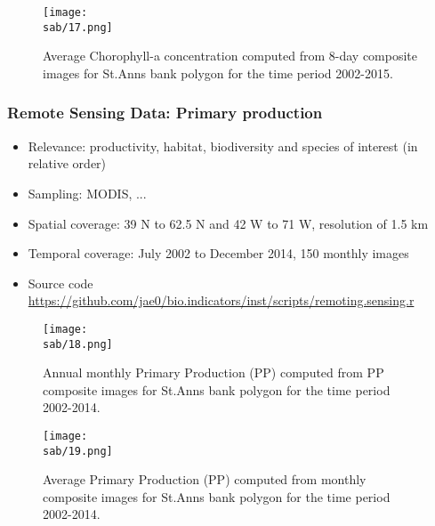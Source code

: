 \documentclass{beamer}
\numberwithin{equation}{section}		%
\numberwithin{figure}{section}		%
\numberwithin{table}{section}				%
\newcommand{\D}{.}
\newcommand{\bd}{\string~/bio\D data}   %
\newcommand{\sab}{\bd/mpa/sab}   %
\begin{document}

\begin{frame}[shrink]
  \begin{figure}[h]
    \centering
    \texttt{[image: \\sab/17.png]}
    \caption {Average Chorophyll-a concentration computed from 8-day composite images for St.Anns bank polygon for the time period 2002-2015. }
    \label{fig:ChlaSeasonal}
  \end{figure}
\end{frame}



\begin{frame}
  \frametitle{Remote Sensing Data: Primary production}
  \begin{itemize}
    \item Relevance:  productivity, habitat, biodiversity and species of interest (in relative order)
    \item Sampling:  MODIS, ...
    \item Spatial coverage: 39 N to 62.5 N and 42 W to 71 W, resolution of 1.5 km
    \item Temporal coverage: July 2002 to December 2014, 150 monthly  images
    \item Source code \url{https://github.com/jae0/bio.indicators/inst/scripts/remoting.sensing.r}
  \end{itemize}
\end{frame}



\begin{frame}[shrink]
  \begin{figure}[h]
    \centering
    \texttt{[image: \\sab/18.png]}
    \caption{Annual monthly Primary Production (PP) computed from PP composite images for St.Anns bank polygon for the time period 2002-2014.}
    \label{fig:ppTSmonthly}
  \end{figure}
\end{frame}



\begin{frame}[shrink]
  \begin{figure}[h]
    \centering
    \texttt{[image: \\sab/19.png]}
    \caption{Average Primary Production (PP) computed from monthly composite images for St.Anns bank polygon for the time period 2002-2014.}
    \label{fig:ppTSannual}
  \end{figure}
\end{frame}
\end{document}
